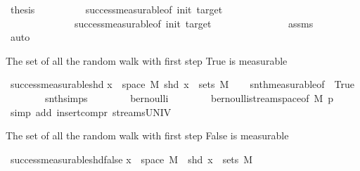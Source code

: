 \begin{isabellebody}
\ {\isacharquery}{\kern0pt}thesis\isanewline
\ \ \ \ \ \ \ \ \isamarkupfalse%
\ success{\isacharunderscore}{\kern0pt}measurable{}{\isacharbrackleft}{\kern0pt}of\ init\ target\ {\isacharbrackright}{\kern0pt}\isanewline
\ \ \ \ \ \ \ \ \ \ \ \ \ \ success{\isacharunderscore}{\kern0pt}measurable{}{\isacharbrackleft}{\kern0pt}of\ init\ target\ {\isacharunderscore}{\kern0pt}{\isacharbrackright}{\kern0pt}\isanewline
\ \ \ \ \ \ \ \ \ \ \ \ \ \ assms\isanewline
\ \ \ \ \ \ \ \ \isamarkupfalse%
\ auto\isanewline
\ \ \ \ \isamarkupfalse%
\isanewline
\ \ \isamarkupfalse%
%
\endisatagproof
{\isafoldproof}%
%
\isadelimproof
%
\endisadelimproof
%
\begin{isamarkuptext}%
The set of all the random walk with first step True is measurable%
\end{isamarkuptext}\isamarkuptrue%
\isamarkupfalse%
\ success{\isacharunderscore}{\kern0pt}measurable{\isacharunderscore}{\kern0pt}shd{\isacharcolon}{\kern0pt}\isanewline
{\isachardoublequoteopen}{\isacharbraceleft}{\kern0pt}x\ {\isasymin}\ space\ M{\isachardot}{\kern0pt}\ shd\ x{\isacharbraceright}{\kern0pt}\ {\isasymin}\ sets\ M{\isachardoublequoteclose}\isanewline
%
\isadelimproof
\ \ %
\endisadelimproof
%
\isatagproof
{}\isamarkupfalse%
\ snth{\isacharunderscore}{\kern0pt}measurable{\isacharbrackleft}{\kern0pt}of\ {}\ True{\isacharbrackright}{\kern0pt}\isanewline
\ \ \ \ \ \ \ \ snth{\isachardot}{\kern0pt}simps{\isacharparenleft}{\kern0pt}{}{\isacharparenright}{\kern0pt}\isanewline
\ \ \ \ \ \ \ \ bernoulli\isanewline
\ \ \ \ \ \ \ \ bernoulli{\isacharunderscore}{\kern0pt}stream{\isacharunderscore}{\kern0pt}space{\isacharbrackleft}{\kern0pt}of\ M\ p{\isacharbrackright}{\kern0pt}\isanewline
\ \ \isamarkupfalse%
\ {\isacharparenleft}{\kern0pt}simp\ add{\isacharcolon}{\kern0pt}\ insert{\isacharunderscore}{\kern0pt}compr\ streams{\isacharunderscore}{\kern0pt}UNIV{\isacharparenright}{\kern0pt}%
\endisatagproof
{\isafoldproof}%
%
\isadelimproof
%
\endisadelimproof
%
\begin{isamarkuptext}%
The set of all the random walk with first step False is measurable%
\end{isamarkuptext}\isamarkuptrue%
\isamarkupfalse%
\ success{\isacharunderscore}{\kern0pt}measurable{\isacharunderscore}{\kern0pt}shd{\isacharunderscore}{\kern0pt}false{\isacharcolon}{\kern0pt}\isanewline
{\isachardoublequoteopen}{\isacharbraceleft}{\kern0pt}x\ {\isasymin}\ space\ M{\isachardot}{\kern0pt}\ {\isasymnot}\ shd\ x{\isacharbraceright}{\kern0pt}\ {\isasymin}\ sets\ M{\isachardoublequoteclose}\isanewline

\end{isabellebody}
